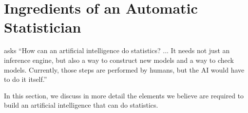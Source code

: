 


\section{Ingredients of an Automatic Statistician}
\label{sec:ingredients}
\citet{gelman2013philblogpost} asks ``How can an artificial intelligence do statistics? ... It needs not just an inference engine, but also a way to construct new models and a way to check models. Currently, those steps are performed by humans, but the AI would have to do it itself.''

In this section, we discuss in more detail the elements we believe are required to build an artificial intelligence that can do statistics.

